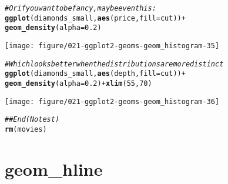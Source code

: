 \documentclass[a4paper,titlepage]{tufte-handout}\usepackage[]{graphicx}\usepackage[]{color}
\makeatletter
\def\maxwidth{ %
  \ifdim\Gin@nat@width>\linewidth
    \linewidth
  \else
    \Gin@nat@width
  \fi
}
\newcommand{\hlnum}[1]{\textcolor[rgb]{0.686,0.059,0.569}{#1}}%
\newcommand{\hlcom}[1]{\textcolor[rgb]{0.678,0.584,0.686}{\textit{#1}}}%
\newcommand{\hlopt}[1]{\textcolor[rgb]{0,0,0}{#1}}%
\newcommand{\hlstd}[1]{\textcolor[rgb]{0.345,0.345,0.345}{#1}}%
\newcommand{\hlkwc}[1]{\textcolor[rgb]{0.333,0.667,0.333}{#1}}%
\newcommand{\hlkwd}[1]{\textcolor[rgb]{0.737,0.353,0.396}{\textbf{#1}}}%
\newenvironment{kframe}{%
 \def\at@end@of@kframe{}%
 \ifinner\ifhmode%
  \def\at@end@of@kframe{\end{minipage}}%
  \begin{minipage}{\columnwidth}%
 \fi\fi%
 \def\FrameCommand##1{\hskip\@totalleftmargin \hskip-\fboxsep
 \colorbox{shadecolor}{##1}\hskip-\fboxsep
     \hskip-\linewidth \hskip-\@totalleftmargin \hskip\columnwidth}%
 \MakeFramed {\advance\hsize-\width
   \@totalleftmargin\z@ \linewidth\hsize
   \@setminipage}}%
 {\par\unskip\endMakeFramed%
 \at@end@of@kframe}
\newenvironment{knitrout}{}{} %
\makeatother
\begin{document}
\begin{knitrout}
\begin{kframe}
\begin{alltt}
\hlcom{# Or if you want to be fancy, maybe even this:}
\hlkwd{ggplot}\hlstd{(diamonds_small,} \hlkwd{aes}\hlstd{(price,} \hlkwc{fill} \hlstd{= cut))} \hlopt{+}
  \hlkwd{geom_density}\hlstd{(}\hlkwc{alpha} \hlstd{=} \hlnum{0.2}\hlstd{)}
\end{alltt}
\end{kframe}
\texttt{[image: figure/021-ggplot2-geoms-geom\_histogram-35]} 
\begin{kframe}\begin{alltt}
\hlcom{# Which looks better when the distributions are more distinct}
\hlkwd{ggplot}\hlstd{(diamonds_small,} \hlkwd{aes}\hlstd{(depth,} \hlkwc{fill} \hlstd{= cut))} \hlopt{+}
  \hlkwd{geom_density}\hlstd{(}\hlkwc{alpha} \hlstd{=} \hlnum{0.2}\hlstd{)} \hlopt{+} \hlkwd{xlim}\hlstd{(}\hlnum{55}\hlstd{,} \hlnum{70}\hlstd{)}
\end{alltt}


{\ttfamily\noindent\color{warningcolor}{\#\# Warning in loop\_apply(n, do.ply): Removed 2 rows containing non-finite values (stat\_density).}}\end{kframe}
\texttt{[image: figure/021-ggplot2-geoms-geom\_histogram-36]} 
\begin{kframe}\begin{alltt}
\hlcom{## End(No test)}
\hlkwd{rm}\hlstd{(movies)}
\end{alltt}
\end{kframe}
\end{knitrout}


\section{geom\_hline}
\end{document}

